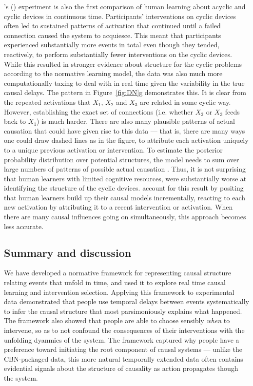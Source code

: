 \documentclass{cambridge7A}%
\def\citeapos#1{\citeauthor{#1}'s (\citeyear{#1})}
\begin{document}
\citeapos{bramley2017dynamic} experiment is also the first comparison of human learning about acyclic and cyclic devices in continuous time.  %
Participants' interventions on cyclic devices often led to sustained patterns of activation that continued until a failed connection caused the system to acquiesce.  This meant that participants experienced substantially more events in total even though they tended, reactively, to perform substantially fewer interventions on the cyclic devices.  While this resulted in stronger evidence about structure for the cyclic problems according to the normative learning model, the data was also much more computationally taxing to deal with in real time given the variability in the true causal delays.  The pattern in Figure~\ref{fig:DN}g demonstrates this.  It is clear from the repeated activations that $X_1$, $X_2$ and $X_3$ are related in some cyclic way.   However, establishing the exact set of connections (i.e. whether $X_2$ or $X_3$ feeds back to $X_1$) is much harder. There are also many plausible patterns of actual causation that could have given rise to this data --- that is, there are many ways one could draw dashed lines as in the figure, to attribute each activation uniquely to a unique previous activation or intervention.   To estimate the posterior probability distribution over potential structures, the model needs to sum over large numbers of patterns of possible actual causation \citep{halpern2016causality}.  Thus, it is not surprising that human learners with limited cognitive resources, were substantially worse at identifying the structure of the cyclic devices.  \cite{bramley2017dynamic} account for this result by positing that human learners build up their causal models incrementally, reacting to each new activation by attributing it to a recent intervention or activation.  When there are many causal influences going on simultaneously, this approach becomes less accurate.

\subsection{Summary and discussion}

We have developed a normative framework for representing causal structure relating events that unfold in time, and used it to explore real time causal learning and intervention selection.   Applying this framework to experimental data demonstrated that people use temporal delays between events systematically to infer the causal structure that most parsimoniously explains what happened.  %
The framework also showed that people are able to choose sensibly \emph{when} to intervene, so as to not confound the consequences of their interventions with the unfolding dyanmics of the system. The framework captured why people have a preference toward initiating the root component of causal systems --- unlike the CBN-packaged data, this more natural temporally extended data often contains evidential signals about the structure of causality as action propagates though the system.
\end{document}
